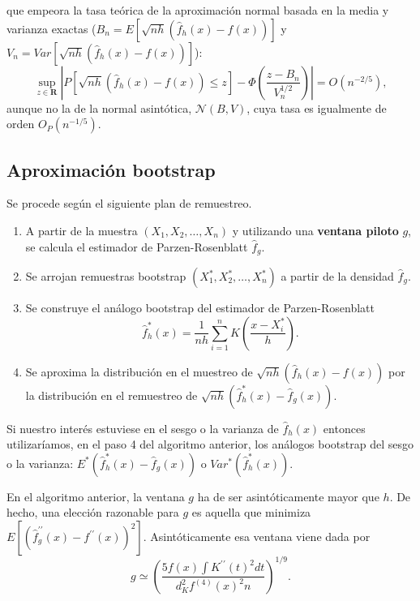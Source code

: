\documentclass[]{book}
\theoremstyle{definition}
\theoremstyle{definition}
\theoremstyle{definition}
\theoremstyle{remark}
\begin{document}
que empeora la tasa teórica de la aproximación normal basada en la media
y varianza exactas
(\(B_n=E\left[ \sqrt{nh}\left( \hat{f}_{h}\left( x \right) -f\left( x \right) \right) \right]\)
y
\(V_n=Var\left[ \sqrt{nh} \left( \hat{f}_{h}\left( x \right) -f\left( x \right) \right) \right]\)):
\[\sup_{z\in \boldsymbol{R}}\left\vert P\left[ \sqrt{nh}\left( \hat{f}
_{h}\left( x \right) -f\left( x \right) \right) \leq z\right] -\Phi \left( 
\frac{z-B_n}{V_n^{1/2}} \right) \right\vert =O\left( n^{-2/5} \right),\]
aunque no la de la normal asintótica, \(\mathcal{N}\left( B,V \right)\),
cuya tasa es igualmente de orden \(O_{P}\left( n^{-1/5} \right)\).

\subsection{Aproximación bootstrap}\label{aproximacion-bootstrap}

Se procede según el siguiente plan de remuestreo.

\begin{enumerate}
\def\labelenumi{\arabic{enumi}.}
\item
  A partir de la muestra \(\left( X_1,X_2,\ldots ,X_n \right)\) y
  utilizando una \textbf{ventana piloto} \(g\), se calcula el estimador
  de Parzen-Rosenblatt \(\hat{f}_{g}\).
\item
  Se arrojan remuestras bootstrap
  \(\left( X_1^{\ast},X_2^{\ast },\ldots ,X_n^{\ast} \right)\) a partir
  de la densidad \(\hat{f}_{g}\).
\item
  Se construye el análogo bootstrap del estimador de Parzen-Rosenblatt
  \[\hat{f}_{h}^{\ast}\left( x \right) =\frac{1}{nh}\sum_{i=1}^{n}K\left( \frac{
  x-X_i^{\ast}}{h} \right).\]
\item
  Se aproxima la distribución en el muestreo de
  \(\sqrt{nh}\left( \hat{f}_{h}\left( x \right) -f\left( x \right) \right)\)
  por la distribución en el remuestreo de
  \(\sqrt{nh}\left( \hat{f}_{h}^{\ast}\left( x \right) - \hat{f}_{g}\left( x \right) \right)\).
\end{enumerate}

Si nuestro interés estuviese en el sesgo o la varianza de
\(\hat{f} _{h}\left( x \right)\) entonces utilizaríamos, en el paso 4
del algoritmo anterior, los análogos bootstrap del sesgo o la varianza:
\(E^{\ast}\left( \hat{f}_{h}^{\ast }\left( x \right) -\hat{f}_{g}\left( x \right) \right)\)
o \(Var^{\ast}\left( \hat{f}_{h}^{\ast}\left( x \right) \right)\).

En el algoritmo anterior, la ventana \(g\) ha de ser asintóticamente
mayor que \(h\). De hecho, una elección razonable para \(g\) es aquella
que minimiza
\(E\left[ \left( \hat{f}_{g}^{\prime \prime }\left( x \right) -f^{\prime \prime }\left( x \right) \right)^2\right]\).
Asintóticamente esa ventana viene dada por
\[g\simeq \left( \frac{5f\left( x \right) \int K^{\prime \prime }\left( t
\right)^2dt}{d_{K}^2f^{\left( 4 \right)}\left( x \right)^2n} \right)^{1/9}.\]
\end{document}
